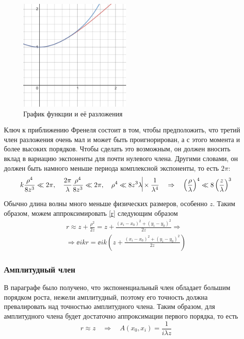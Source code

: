 \documentclass[14pt,a4paper]{extarticle}
\begin{document}
	\begin{figure}[H]
		\centering
		\includegraphics[width=0.5\textwidth]{desmos-graph.pdf}
		\caption{График функции и её разложения}\label{taylor-graph}
	\end{figure}


Ключ к приближению Френеля состоит в том, чтобы предположить, что третий член разложения очень мал и может быть проигнорирован, а с этого момента и более высоких порядков. Чтобы сделать это возможным, он должен вносить вклад в вариацию экспоненты для почти нулевого члена. Другими словами, он должен быть намного меньше периода комплексной экспоненты, то есть $2\pi$:
\begin{equation}
	k\frac{\rho^4}{8z^3}\ll 2\pi, \quad \frac{2\pi}{\lambda}\frac{\rho^4}{8z^3}\ll 2\pi, \quad\rho^4 \ll 8z^3\lambda \vline \times \frac{1}{\lambda^4}\quad\Rightarrow \quad\left(\frac{\rho}{\lambda}\right)^4 \ll 8\left(\frac{z}{\lambda}\right)^3
\end{equation}

Обычно длина волны много меньше физических размеров, особенно $z$. Таким образом, можем аппроксимировать \eqref{r} следующим образом
\begin{multline}
	r\approx z+\frac{\rho^2}{2z}=z+\frac{\left({x_i-x_0}\right)^2+\left({y_i-y_0}\right)^2}{2z}\Rightarrow \\
	\Rightarrow \ee{ikr} = \ee{ik\left(z+\frac{\left({x_i-x_0}\right)^2+\left({y_i-y_0}\right)^2}{2z}\right)}
\end{multline}
\subsubsection{Амплитудный член}\label{amplituda}
В параграфе  было получено, что экспоненциальный член обладает большим порядком роста, нежели амплитудный, поэтому его точность должна превалировать над точностью амплитудного члена. Таким образом, для амплитудного члена будет достаточно аппроксимации первого порядка, то есть 
\begin{equation}
	r \approx z \quad \Rightarrow \quad A(x_0, x_i) = \frac{1}{i\lambda z}
\end{equation}
\end{document}

